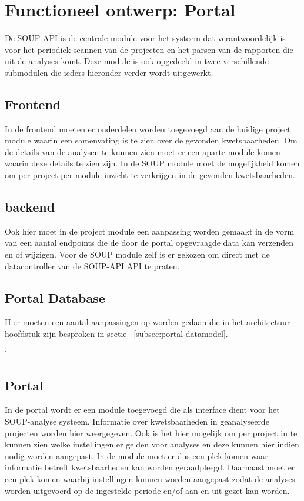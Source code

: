 \chapter{Functioneel ontwerp: Portal}\label{ch:impl-Portal}
De SOUP-API is de centrale module voor het systeem dat verantwoordelijk is voor het periodiek scannen van de projecten en het parsen van de rapporten die uit de analyses komt. Deze module is ook opgedeeld in twee verschillende submodulen die ieders hieronder verder wordt uitgewerkt.


\section{Frontend}
In de frontend moeten er onderdelen worden toegevoegd aan de huidige project module waarin een samenvating is te zien over de gevonden kwetsbaarheden. Om de details van de analysen te kunnen zien moet er een aparte module komen waarin deze details te zien zijn. In de SOUP module moet de mogelijkheid komen om per project per module inzicht te verkrijgen in de gevonden kwetsbaarheden.


\section{backend}
Ook hier moet in de project module een aanpassing worden gemaakt in de vorm van een aantal endpoints die de door de portal opgevraagde data kan verzenden en of wijzigen. Voor de SOUP module zelf is er gekozen om direct met de datacontroller van de SOUP-API API te praten.

\section{Portal Database}
Hier moeten een aantal aanpassingen op worden gedaan die in het architectuur hoofdstuk zijn besproken in sectie ~\ref{subsec:portal-datamodel}.


'


\section{Portal}\label{sec:portal}
In de portal wordt er een module toegevoegd die als interface dient voor het SOUP-analyse systeem. Informatie over kwetsbaarheden in geanalyseerde projecten worden hier weergegeven. Ook is het hier mogelijk om per project in te kunnen zien welke instellingen er gelden voor analyses en deze kunnen hier indien nodig worden aangepast.
In de module moet er dus een plek komen waar informatie betreft kwetsbaarheden kan worden geraadpleegd. Daarnaast moet er een plek komen waarbij instellingen kunnen worden aangepast zodat de analyses worden uitgevoerd op de ingestelde periode en/of aan en uit gezet kan worden.
